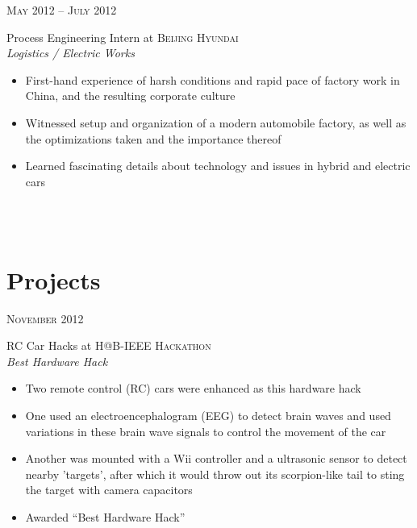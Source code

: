 \documentclass[10pt]{article} %
\begin{document}
{\begin{minipage}[t]{0.5\textwidth}

{\raggedleft\textsc{May 2012 -- July 2012}\par}

{\raggedright\large Process Engineering Intern at \textsc{Beijing Hyundai}\\
\textit{Logistics / Electric Works}\\[5pt]}

\normalsize{
  \begin{itemize}
  \item First-hand experience of harsh conditions and rapid pace of factory
    work in China, and the resulting corporate culture
  \item Witnessed setup and organization of a modern automobile factory, as
    well as the optimizations taken and the importance thereof
  \item Learned fascinating details about technology and issues in hybrid
    and electric cars
  \end{itemize}
}\\[10pt]\\


\section{Projects} 


{\raggedleft\textsc{November 2012}\par}

{\raggedright\large RC Car Hacks at \textsc{H@B-IEEE Hackathon}\\
\textit{Best Hardware Hack}\\[5pt]}

\normalsize{
  \begin{itemize}
  \item Two remote control (RC) cars were enhanced as this hardware hack
  \item One used an electroencephalogram (EEG) to detect brain waves and
    used variations in these brain wave signals to control the movement of
    the car
  \item Another was mounted with a Wii controller and a ultrasonic sensor
    to detect nearby 'targets', after which it would throw out its
    scorpion-like tail to sting the target with camera capacitors
  \item Awarded ``Best Hardware Hack''
  \end{itemize}
}\\


\end{minipage}}
\end{document}
